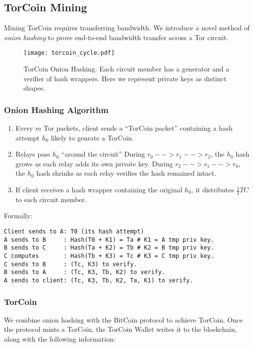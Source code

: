 \subsection{TorCoin Mining}

Mining TorCoin requires transferring bandwidth. We introduce a novel method of \textit{onion hashing} to prove end-to-end bandwidth transfer across a Tor circuit.

\begin{figure}[H]
  \centering
    \texttt{[image: torcoin\_cycle.pdf]}
  \caption{TorCoin Onion Hashing. Each circuit member has a generator and a verifier of hash wrappers. Here we represent private keys as distinct shapes.}
\end{figure}

\subsubsection{Onion Hashing Algorithm}
\begin{enumerate}
\item Every $m$ Tor packets, client sends a ``TorCoin packet'' containing a hash attempt $h_0$ likely to genrate a TorCoin.
\item Relays pass $h_0$ ``around the circuit''
\subitem During $r_0 --> r_1 --> r_2$, the $h_0$ hash grows as each relay adds its own private key.
\subitem During $r_2 --> r_1 --> r_0$, the $h_0$ hash shrinks as each relay verifies the hash remained intact.
\item If client receives a hash wrapper containing the original $h_0$, it distributes $\frac{1}{3} TC$ to each circuit member.
\end{enumerate}

Formally:

\begin{verbatim}
Client sends to A: T0 (its hash attempt)
A sends to B     : Hash(T0 + K1) = Ta # K1 = A tmp priv key.
B sends to C     : Hash(Ta + K2) = Tb # K2 = B tmp priv key.
C computes       : Hash(Tb + K3) = Tc # K3 = C tmp priv key.
C sends to B     : (Tc, K3) to verify.
B sends to A     : (Tc, K3, Tb, K2) to verify.
A sends to client: (Tc, K3, Tb, K2, Ta, K1) to verify.
\end{verbatim}

\subsubsection{TorCoin}
We combine onion hashing with the BitCoin protocol to achieve TorCoin. Once the protocol mints a TorCoin, the TorCoin Wallet writes it to the blockchain, along with the following information:

